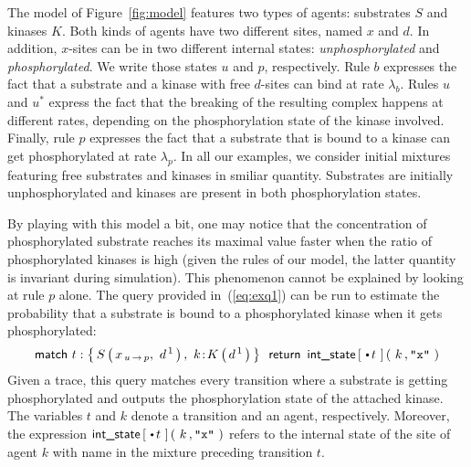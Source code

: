 \documentclass[runningheads]{llncs}
\begin{document}
The model of Figure~\ref{fig:model} features two types of agents:
substrates $S$ and kinases $K$. Both kinds of agents have two
different sites, named $x$ and $d$. In addition, $x$-sites can be in
two different internal states: \textit{unphosphorylated} and
\textit{phosphorylated}. We write those states $u$ and $p$,
respectively. Rule $b$ expresses the fact that a substrate and a
kinase with free $d$-sites can bind at rate $\lambda_b$. Rules $u$ and
$u^*$ express the fact that the breaking of the resulting complex
happens at different rates, depending on the phosphorylation state of
the kinase involved. Finally, rule $p$ expresses the fact that a
substrate that is bound to a kinase can get phosphorylated at rate
$\lambda_p$. In all our examples, we consider initial mixtures
featuring free substrates and kinases in smiliar quantity. Substrates
are initially unphosphorylated and kinases are present in both
phosphorylation states.




By playing with this model a bit, one may notice that the
concentration of phosphorylated substrate reaches its maximal value
faster when the ratio of phosphorylated kinases is high (given the
rules of our model, the latter quantity is invariant during
simulation). This phenomenon cannot be explained by looking at rule
$p$ alone. The query provided in~(\ref{eq:exq1}) can be run to
estimate the probability that a substrate is bound to a phosphorylated
kinase when it gets phosphorylated:
\begin{equation}\label{eq:exq1}
  \m{match } t:\Set{ \AG{S}{x_{\Trans{u}{p}},\ d^{\,1}},\ \iAG{k}{K}{d^{\,1}} }
  \, \m{ return } \, \IntState{\,\StateBefore{t}\,}{\,k\,}{\STR{x}\,}
\end{equation}
Given a trace, this query matches every transition where a substrate
is getting phosphorylated and outputs the phosphorylation state of the
attached kinase. The variables $t$ and $k$ denote a transition and an
agent, respectively. Moreover, the expression
$\IntState{\,\StateBefore{t}\,}{\,k\,}{\STR{x}\,}$ refers to the
internal state of the site of agent $k$ with name  in the
mixture preceding transition $t$.
\end{document}
